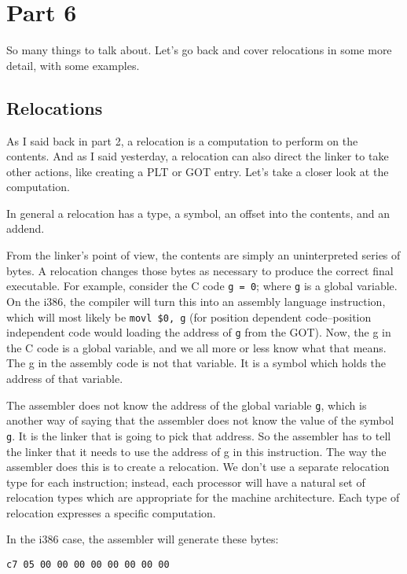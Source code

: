 \section{Part 6}
So many things to talk about. Let's go back and cover relocations in some more
detail, with some examples.

\subsection{Relocations}

As I said back in part 2, a relocation is a computation to perform on the
contents. And as I said yesterday, a relocation can also direct the linker to
take other actions, like creating a PLT or GOT entry. Let's take a closer look
at the computation.

In general a relocation has a type, a symbol, an offset into the contents, and
an addend.

From the linker's point of view, the contents are simply an uninterpreted
series of bytes. A relocation changes those bytes as necessary to produce the
correct final executable. For example, consider the C code \texttt{g = 0};
where \texttt{g} is a global variable. On the i386, the compiler will turn this
into an assembly language instruction, which will most likely be \texttt{movl
\$0, g} (for position dependent code--position independent code would loading
the address of \texttt{g} from the GOT). Now, the g in the C code is a global
variable, and we all more or less know what that means. The g in the assembly
code is not that variable. It is a symbol which holds the address of that
variable.

The assembler does not know the address of the global variable \texttt{g},
which is another way of saying that the assembler does not know the value of
the symbol \texttt{g}. It is the linker that is going to pick that address. So
the assembler has to tell the linker that it needs to use the address of g in
this instruction. The way the assembler does this is to create a relocation.
We don't use a separate relocation type for each instruction; instead, each
processor will have a natural set of relocation types which are appropriate
for the machine architecture. Each type of relocation expresses a specific
computation.

In the i386 case, the assembler will generate these bytes:

\begin{verbatim}
c7 05 00 00 00 00 00 00 00 00
\end{verbatim}

